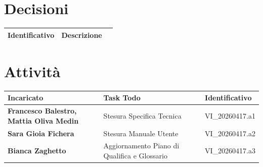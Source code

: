 \documentclass[a4paper,12pt]{article}
\begin{document}
\section{Decisioni} {
        \begin{tabularx}{\textwidth}{|l|X|l|}
            \hline
            \textbf{Identificativo} & \textbf{Descrizione}\\
            \hline
        \end{tabularx}
    }

\section{Attività} {
        \begin{tabularx}{\textwidth}{|>{\raggedright\arraybackslash}p{4cm}|X|l|}
            \hline
            \textbf{Incaricato} & \textbf{Task Todo} & \textbf{Identificativo} \\
            \hline
            \textbf{Francesco Balestro, Mattia Oliva Medin} & Stesura Specifica Tecnica & VI\_20260417.a1 \\
            \hline
            \textbf{Sara Gioia Fichera} & Stesura Manuale Utente & VI\_20260417.a2 \\
            \hline
            \textbf{Bianca Zaghetto} & Aggiornamento Piano di Qualifica e Glossario & VI\_20260417.a3 \\
            \hline
        \end{tabularx}
}
\end{document}

